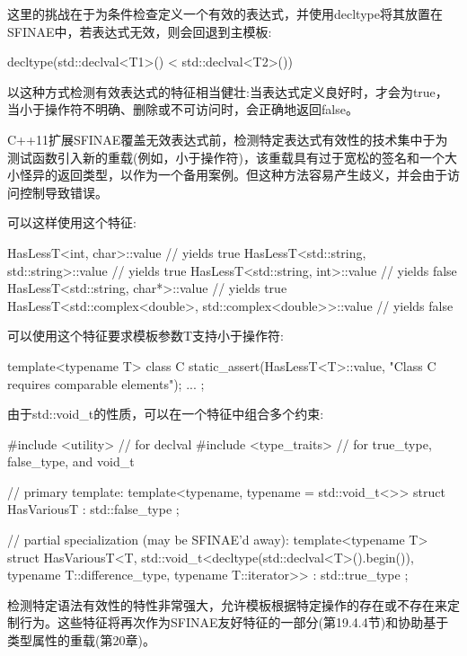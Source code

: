 这里的挑战在于为条件检查定义一个有效的表达式，并使用decltype将其放置在SFINAE中，若表达式无效，则会回退到主模板:

\begin{cpp}
decltype(std::declval<T1>() < std::declval<T2>())
\end{cpp}

以这种方式检测有效表达式的特征相当健壮:当表达式定义良好时，才会为true，当小于操作符不明确、删除或不可访问时，会正确地返回false。

\begin{notice}
C++11扩展SFINAE覆盖无效表达式前，检测特定表达式有效性的技术集中于为测试函数引入新的重载(例如，小于操作符)，该重载具有过于宽松的签名和一个大小怪异的返回类型，以作为一个备用案例。但这种方法容易产生歧义，并会由于访问控制导致错误。
\end{notice}

可以这样使用这个特征:

\begin{cpp}
HasLessT<int, char>::value // yields true
HasLessT<std::string, std::string>::value // yields true
HasLessT<std::string, int>::value // yields false
HasLessT<std::string, char*>::value // yields true
HasLessT<std::complex<double>, std::complex<double>>::value // yields false
\end{cpp}

可以使用这个特征要求模板参数T支持小于操作符:

\begin{cpp}
template<typename T>
class C
{
	static_assert(HasLessT<T>::value,
				  "Class C requires comparable elements");
	...
};
\end{cpp}

由于std::void\_t的性质，可以在一个特征中组合多个约束:

\begin{cpp}
#include <utility> // for declval
#include <type_traits> // for true_type, false_type, and void_t

// primary template:
template<typename, typename = std::void_t<>>
struct HasVariousT : std::false_type
{
};

// partial specialization (may be SFINAE'd away):
template<typename T>
struct HasVariousT<T, std::void_t<decltype(std::declval<T>().begin()),
					typename T::difference_type,
					typename T::iterator>>
: std::true_type
{
};
\end{cpp}

检测特定语法有效性的特性非常强大，允许模板根据特定操作的存在或不存在来定制行为。这些特征将再次作为SFINAE友好特征的一部分(第19.4.4节)和协助基于类型属性的重载(第20章)。

